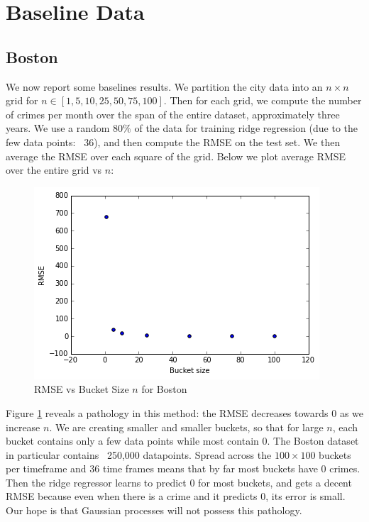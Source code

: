 \documentclass[11pt]{article}
\begin{document}
\section{Baseline Data}

\subsection{Boston}
We now report some baselines results. We partition the city data into an $n \times n$ grid for $n \in [1, 5, 10, 25, 50, 75, 100]$. Then for each grid, we compute the number of crimes per month over the span of the entire dataset, approximately three years. We use a random $80\%$ of the data for training ridge regression (due to the few data points: ~36), and then compute the RMSE on the test set. We then average the RMSE over each square of the grid. Below we plot average RMSE over the entire grid vs $n$:\\

\begin{figure}[h!]
\centering
\includegraphics[scale=0.8]{boston_ridge.png}
\caption{RMSE vs Bucket Size $n$ for Boston}
\label{fig:bos_rmse}
\end{figure}

Figure \ref{fig:bos_rmse} reveals a pathology in this method: the RMSE decreases towards 0 as we increase $n$. We are creating smaller and smaller buckets, so that for large $n$, each bucket contains only a few data points while most contain 0. The Boston dataset in particular contains ~250,000 datapoints. Spread across the $100 \times 100$ buckets per timeframe and $36$ time frames means that by far most buckets have 0 crimes. Then the ridge regressor learns to predict 0 for most buckets, and gets a decent RMSE because even when there is a crime and it predicts 0, its error is small. Our hope is that Gaussian processes will not possess this pathology.
\end{document}
